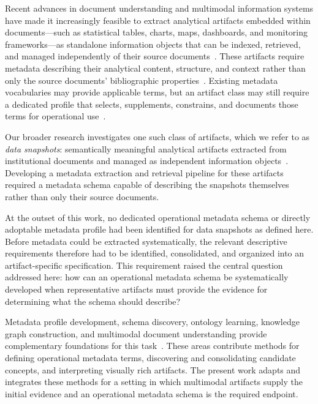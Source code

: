 \documentclass{article}
\begin{document}
Recent advances in document understanding and multimodal information systems have made it increasingly feasible to extract analytical artifacts embedded within documents---such as statistical tables, charts, maps, dashboards, and monitoring frameworks---as standalone information objects that can be indexed, retrieved, and managed independently of their source documents~\citep{wang2025,dy2026}. These artifacts require metadata describing their analytical content, structure, and context rather than only the source documents' bibliographic properties~\citep{gilliland2008}. Existing metadata vocabularies may provide applicable terms, but an artifact class may still require a dedicated profile that selects, supplements, constrains, and documents those terms for operational use~\citep{greenberg2005,coyle2009applicationprofiles}.

Our broader research investigates one such class of artifacts, which we refer to as \emph{data snapshots}: semantically meaningful analytical artifacts extracted from institutional documents and managed as independent information objects~\citep{dy2026}. Developing a metadata extraction and retrieval pipeline for these artifacts required a metadata schema capable of describing the snapshots themselves rather than only their source documents.

At the outset of this work, no dedicated operational metadata schema or directly adoptable metadata profile had been identified for data snapshots as defined here. Before metadata could be extracted systematically, the relevant descriptive requirements therefore had to be identified, consolidated, and organized into an artifact-specific specification. This requirement raised the central question addressed here: how can an operational metadata schema be systematically developed when representative artifacts must provide the evidence for determining what the schema should describe?

Metadata profile development, schema discovery, ontology learning, knowledge graph construction, and multimodal document understanding provide complementary foundations for this task~\citep{coyle2009applicationprofiles,sadruddin2025schemadiscovery,giglou2023llms4ol,zhang2024edc,ding2026vrdu}. These areas contribute methods for defining operational metadata terms, discovering and consolidating candidate concepts, and interpreting visually rich artifacts. The present work adapts and integrates these methods for a setting in which multimodal artifacts supply the initial evidence and an operational metadata schema is the required endpoint.
\end{document}
